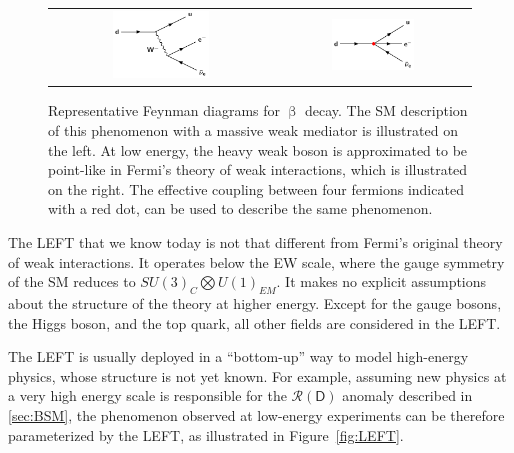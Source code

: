 \begin{figure}[tbh!]
 \begin{center}
 \begin{tabular}{cc}
 \includegraphics[width=0.45\textwidth]{figures/Part1/EFT/BetaDecay}&
 \includegraphics[width=0.45\textwidth]{figures/Part1/EFT/FermiTheory}\\
 \end{tabular}
 \caption{Representative Feynman diagrams for $\upbeta$ decay. The \ac{SM} description of this phenomenon with a massive weak mediator is illustrated on the left. At low energy, the heavy weak boson is approximated to be point-like in Fermi's theory of weak interactions, which is illustrated on the right. The effective coupling between four fermions indicated with a red dot, can be used to describe the same phenomenon.}
 \label{fig:FermiEFT}
 \end{center}
\end{figure}

The \ac{LEFT} that we know today is not that different from Fermi's original theory of weak interactions. It operates below the \ac{EW} scale, where the gauge symmetry of the \ac{SM} reduces to $SU(3)_{C}\bigotimes U(1)_{EM}$. It makes no explicit assumptions about the structure of the theory at higher energy. Except for the gauge bosons, the Higgs boson, and the top quark, all other fields are considered in the \ac{LEFT}. 

The \ac{LEFT} is usually deployed in a ``bottom-up'' way to model high-energy physics, whose structure is not yet known. For example, assuming new physics at a very high energy scale is responsible for the $\mathcal{R}(\textsf{D})$ anomaly described in \autoref{sec:BSM}, the phenomenon observed at low-energy experiments can be therefore parameterized by the \ac{LEFT}, as illustrated in Figure~\ref{fig:LEFT}.


